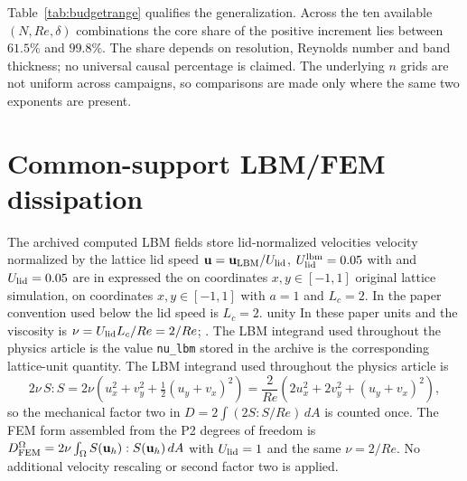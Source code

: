 \documentclass[11pt]{article}
\newcommand{\tabbox}[1]{\resizebox{\ifdim\width>\textwidth\textwidth\else\width\fi}{!}{#1}}
\begin{document}
\begin{table}[H]
\centering
\caption{Core share of the $n=4\to8$ increase wherever both exponents exist.
The $Re=100$, $N=256$ increment is unavailable because that campaign has no
$n=8$ field.}




\label{tab:budgetrange}
\tabbox{}
\end{table}
\par

Table~\ref{tab:budgetrange} qualifies the generalization. Across the ten
available $(N,Re,\delta)$ combinations the core share of the positive increment
lies between $61.5\%$ and $99.8\%$. The share depends on resolution, Reynolds
number and band thickness; no universal causal percentage is claimed. The
underlying $n$ grids are not uniform across campaigns, so comparisons are made
only where the same two exponents are present.

\section{Common-support LBM/FEM dissipation}
\label{sec:common_support}

The \color{revred}archived \color{revblue}computed\color{black} LBM fields store \color{revred}lid-normalized \color{revblue}velocities\color{black} \color{revred}velocity \color{revblue}normalized by the lattice lid speed\color{black}
\color{revred}$\mathbf{u}=\mathbf{u}_{\rm LBM}/U_{\rm lid}$, \color{revblue}$U_{\rm lid}^{\rm lbm}=0.05$\color{black} \color{revred}with \color{revblue}and\color{black} \color{revred}$U_{\rm lid}=0.05$ \color{revblue}are\color{black} \color{revred}in \color{revblue}expressed\color{black} \color{revred}the \color{revblue}on coordinates $x,y\in[-1,1]$\color{black}
\color{revred}original lattice simulation, on coordinates $x,y\in[-1,1]$ \color{black}with $a=1$ and\color{revblue} $L_c=2$. In the paper convention used below the lid speed is\color{black}
\color{revred}$L_c=2$. \color{revblue}unity\color{black} \color{revred}In these paper units \color{revblue}and\color{black} the viscosity is $\nu=U_{\rm lid}L_c/Re=2/Re$\color{revred}; \color{revblue}. The LBM integrand used throughout the physics article is\color{black}
\color{revred}the value \texttt{nu\_lbm} stored in the archive is the corresponding lattice-unit
\color{black}
\color{revred}quantity. The LBM integrand used throughout the physics article is
\color{black}
\begin{equation}
  2\nu\,S:S = 2\nu\left(u_x^2+v_y^2+\tfrac12(u_y+v_x)^2\right)
            = \frac{2}{Re}\left(2u_x^2+2v_y^2+(u_y+v_x)^2\right),
  \label{eq:mech_factor}
\end{equation}
so the mechanical factor two in $D=2\int(2S:S/Re)\,dA$ is counted once. The
FEM form assembled from the P2 degrees of freedom is
$D_{\rm FEM}^{\Omega}=2\nu\int_\Omega S(\mathbf{u}_h):S(\mathbf{u}_h)\,dA$
with $U_{\rm lid}=1$ and the same $\nu=2/Re$. No additional velocity rescaling
or second factor two is applied.
\end{document}
